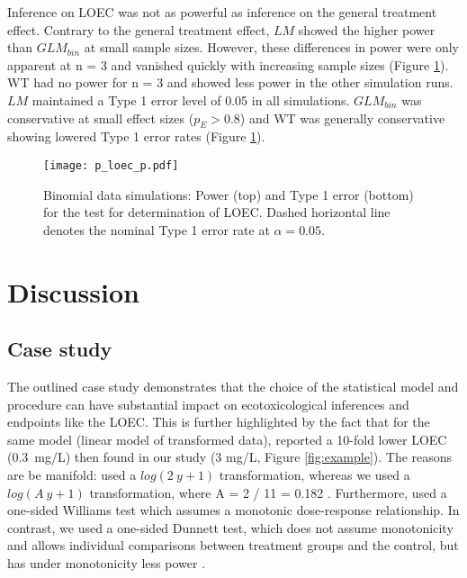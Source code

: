 \documentclass[twocolumn, natbib]{svjour3}
\begin{document}
Inference on LOEC was not as powerful as inference on the general treatment effect.
Contrary to the general treatment effect, $LM$ showed the higher power than $GLM_{bin}$ at small sample sizes.
However, these differences in power were only apparent at n = 3 and vanished quickly with increasing sample sizes (Figure \ref{fig:p_loec_p}). 
WT had no power for n = 3 and showed less power in the other simulation runs.
$LM$ maintained a Type 1 error level of 0.05 in all simulations. 
$GLM_{bin}$ was conservative at small effect sizes ($p_E > 0.8$) and WT was generally conservative showing lowered Type 1 error rates (Figure \ref{fig:p_loec_p}).

\begin{figure}
  \centering
  \texttt{[image: p\_loec\_p.pdf]}
  \caption{
  Binomial data simulations: 
  Power (top) and Type 1 error (bottom) for the test for determination of LOEC. 
  Dashed horizontal line denotes the nominal Type 1 error rate at $\alpha = 0.05$.
  }
  \label{fig:p_loec_p}
\end{figure}


\section{Discussion}
\label{sec:disc}
\subsection{Case study}
The outlined case study demonstrates that the choice of the statistical model and procedure can have substantial impact on ecotoxicological inferences and endpoints like the LOEC.
This is further highlighted by the fact that for the same model (linear model of transformed data), \citet{brock_minimum_2015} reported a 10-fold lower LOEC (\mbox{0.3 mg/L}) then found in our study (3 mg/L, Figure \ref{fig:example}).
The reasons are be manifold: \citep{brock_minimum_2015} used a $log(2~y + 1)$ transformation, whereas we used a $log(A~y + 1)$ transformation, where A = 2 / 11 = 0.182 \citep{van_den_brink_impact_2000}.
Furthermore, \citet{brock_minimum_2015} used a one-sided Williams test which assumes a monotonic dose-response relationship.
In contrast, we used a one-sided Dunnett test, which does not assume monotonicity and allows individual comparisons between treatment groups and the control, but has under monotonicity less power \citep{jaki_statistical_2013}.
\end{document}
